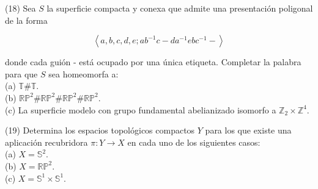 \documentclass[
  a4paper,
  spanish,
  12pt,
]{scrartcl}
\begin{document}
\begin{ejer}
(18) Sea $S$ la superficie compacta y conexa que admite una presentación poligonal de la forma

$$
\left\langle a, b, c, d, e ; a b^{-1} c-d a^{-1} e b c^{-1}-\right\rangle
$$

donde cada guión - está ocupado por una única etiqueta. Completar la palabra para que $S$ sea homeomorfa a:\\
(a) $\mathbb{T} \# \mathbb{T}$.\\
(b) $\mathbb{R} \mathbb{P}^{2} \# \mathbb{R} \mathbb{P}^{2} \# \mathbb{R} \mathbb{P}^{2} \# \mathbb{R} \mathbb{P}^{2}$.\\
(c) La superficie modelo con grupo fundamental abelianizado isomorfo a $\mathbb{Z}_{2} \times \mathbb{Z}^{4}$.\\
\end{ejer}

\begin{ejer}
(19) Determina los espacios topológicos compactos $Y$ para los que existe una aplicación recubridora $\pi: Y \rightarrow X$ en cada uno de los siguientes casos:\\
(a) $X=\mathbb{S}^{2}$.\\
(b) $X=\mathbb{R} \mathbb{P}^{2}$.\\
(c) $X=\mathbb{S}^{1} \times \mathbb{S}^{1}$.
\end{ejer}
\end{document}
